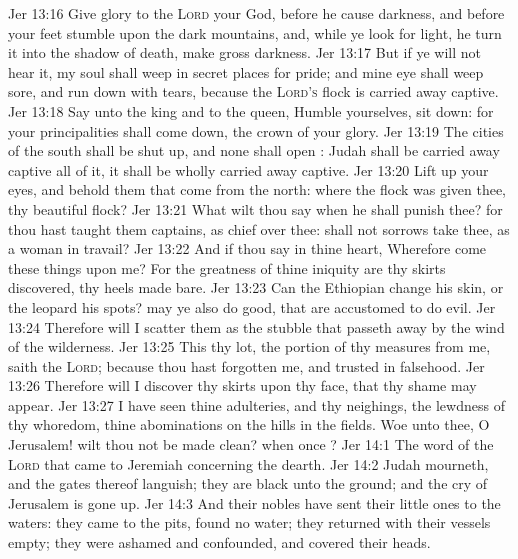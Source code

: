 \vs Jer 13:16 Give glory to the \textsc{Lord} your God, before he cause darkness, and before your feet stumble upon the dark mountains, and, while ye look for light, he turn it into the shadow of death,  make  gross darkness.
\vs Jer 13:17 But if ye will not hear it, my soul shall weep in secret places for  pride; and mine eye shall weep sore, and run down with tears, because the \textsc{Lord's} flock is carried away captive.
\vs Jer 13:18 Say unto the king and to the queen, Humble yourselves, sit down: for your principalities shall come down,  the crown of your glory.
\vs Jer 13:19 The cities of the south shall be shut up, and none shall open : Judah shall be carried away captive all of it, it shall be wholly carried away captive.
\vs Jer 13:20 Lift up your eyes, and behold them that come from the north: where  the flock  was given thee, thy beautiful flock?
\vs Jer 13:21 What wilt thou say when he shall punish thee? for thou hast taught them  captains,  as chief over thee: shall not sorrows take thee, as a woman in travail?
\vs Jer 13:22 And if thou say in thine heart, Wherefore come these things upon me? For the greatness of thine iniquity are thy skirts discovered,  thy heels made bare.
\vs Jer 13:23 Can the Ethiopian change his skin, or the leopard his spots?  may ye also do good, that are accustomed to do evil.
\vs Jer 13:24 Therefore will I scatter them as the stubble that passeth away by the wind of the wilderness.
\vs Jer 13:25 This  thy lot, the portion of thy measures from me, saith the \textsc{Lord}; because thou hast forgotten me, and trusted in falsehood.
\vs Jer 13:26 Therefore will I discover thy skirts upon thy face, that thy shame may appear.
\vs Jer 13:27 I have seen thine adulteries, and thy neighings, the lewdness of thy whoredom,  thine abominations on the hills in the fields. Woe unto thee, O Jerusalem! wilt thou not be made clean? when  once ?
\vs Jer 14:1 The word of the \textsc{Lord} that came to Jeremiah concerning the dearth.
\vs Jer 14:2 Judah mourneth, and the gates thereof languish; they are black unto the ground; and the cry of Jerusalem is gone up.
\vs Jer 14:3 And their nobles have sent their little ones to the waters: they came to the pits,  found no water; they returned with their vessels empty; they were ashamed and confounded, and covered their heads.
